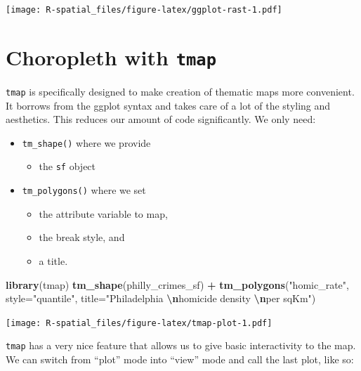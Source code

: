 \documentclass[
]{book}
\newenvironment{Shaded}{\begin{snugshade}}{\end{snugshade}}
\newcommand{\AttributeTok}[1]{\textcolor[rgb]{0.13,0.29,0.53}{#1}}
\newcommand{\FunctionTok}[1]{\textcolor[rgb]{0.13,0.29,0.53}{\textbf{#1}}}
\newcommand{\NormalTok}[1]{#1}
\newcommand{\SpecialCharTok}[1]{\textcolor[rgb]{0.81,0.36,0.00}{\textbf{#1}}}
\newcommand{\StringTok}[1]{\textcolor[rgb]{0.31,0.60,0.02}{#1}}
\providecommand{\tightlist}{%
  \setlength{\itemsep}{0pt}\setlength{\parskip}{0pt}}
\begin{document}
\texttt{[image: R-spatial\_files/figure-latex/ggplot-rast-1.pdf]}

\hypertarget{choropleth-with-tmap}{%
\section{\texorpdfstring{Choropleth with \texttt{tmap}}{Choropleth with tmap}}\label{choropleth-with-tmap}}

\texttt{tmap} is specifically designed to make creation of thematic maps more convenient. It borrows from the ggplot syntax and takes care of a lot of the styling and aesthetics. This reduces our amount of code significantly. We only need:

\begin{itemize}
\tightlist
\item
  \texttt{tm\_shape()} where we provide

  \begin{itemize}
  \tightlist
  \item
    the \texttt{sf} object
  \end{itemize}
\item
  \texttt{tm\_polygons()} where we set

  \begin{itemize}
  \tightlist
  \item
    the attribute variable to map,
  \item
    the break style, and
  \item
    a title.
  \end{itemize}
\end{itemize}

\begin{Shaded}
\begin{Highlighting}[]
\FunctionTok{library}\NormalTok{(tmap)}
\FunctionTok{tm\_shape}\NormalTok{(philly\_crimes\_sf) }\SpecialCharTok{+}
  \FunctionTok{tm\_polygons}\NormalTok{(}\StringTok{"homic\_rate"}\NormalTok{, }
              \AttributeTok{style=}\StringTok{"quantile"}\NormalTok{, }
              \AttributeTok{title=}\StringTok{"Philadelphia }\SpecialCharTok{\textbackslash{}n}\StringTok{homicide density }\SpecialCharTok{\textbackslash{}n}\StringTok{per sqKm"}\NormalTok{)}
\end{Highlighting}
\end{Shaded}

\texttt{[image: R-spatial\_files/figure-latex/tmap-plot-1.pdf]}

\texttt{tmap} has a very nice feature that allows us to give basic interactivity to the map. We can switch from ``plot'' mode into ``view'' mode and call the last plot, like so:
\end{document}
